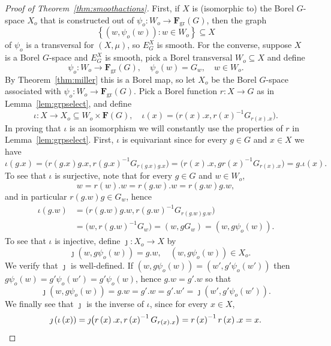 \documentclass{amsart}
\numberwithin{equation}{subsection}
\begin{document}
\begin{proof}[Proof of Theorem~\ref{thm:smoothactions}]
First, if \(X\) is (isomorphic to) the Borel \(G\)-space \(X_{o}\) that is constructed out of \(\psi_{o}:W_{o}\to\mathbf{F}_{\mathrm{gr}}\left(G\right)\), then the graph
\[\left\{ \left(w,\psi_{o}\left(w\right)\right):w\in W_{o}\right\} \subseteq X\]
of \(\psi_{o}\) is a transversal for \(\left(X,\mu\right)\), so \(E_{G}^{X}\) is  smooth. For the converse, suppose \(X\) is a Borel \(G\)-space and \(E_{G}^{X}\) is smooth, pick a Borel transversal \(W_{o}\subseteq X\) and define
\[\psi_{o}:W_{o}\to\mathbf{F}_{\mathrm{gr}}\left(G\right),\quad\psi_{o}\left(w\right)=G_{w},\quad w\in W_{o}.\]
By Theorem~\ref{thm:miller} this is a Borel map, so let \(X_{o}\) be the Borel \(G\)-space associated with \(\psi_{o}:W_{o}\to\mathbf{F}_{\mathrm{gr}}\left(G\right)\). Pick a Borel function \(r:X\to G\) as in Lemma~\ref{lem:grpselect}, and define
\[\iota:X\to X_{o}\subseteq W_{o}\times\mathbf{F}\left(G\right),\quad\iota\left(x\right)=\big(r\left(x\right).x,r\left(x\right)^{-1}G_{r\left(x\right).x}\big).\]
In proving that \(\iota\) is an isomorphism we will constantly use the properties of \(r\) in Lemma~\ref{lem:grpselect}. First, \(\iota\) is equivariant since for every \(g\in G\) and \(x\in X\) we have
\[\iota\left(g.x\right)=\big(r\left(g.x\right)g.x,r\left(g.x\right)^{-1}G_{r\left(g.x\right)g.x}\big)=\big(r\left(x\right).x,gr\left(x\right)^{-1}G_{r\left(x\right).x}\big)=g.\iota\left(x\right).\]To see that \(\iota\) is surjective, note that for every \(g\in G\) and \(w\in W_{o}\),    \[w=r\left(w\right).w=r\left(g.w\right).w=r\left(g.w\right)g.w,\]
and in particular \(r\left(g.w\right)g\in G_{w}\), hence
\begin{align*}
\iota\left(g.w\right)
&=\big(r\left(g.w\right)g.w,r\left(g.w\right)^{-1}G_{r\left(g.w\right)g.w}\big)\\
&=\big(w,r\left(g.w\right)^{-1}G_{w}\big)=\left(w,gG_{w}\right)=\left(w,g\psi_{o}\left(w\right)\right).
\end{align*}
To see that \(\iota\) is injective, define \(\jmath:X_{o}\to X\) by
\[\quad\jmath\left(w,g\psi_{o}\left(w\right)\right)=g.w,\quad\left(w,g\psi_{o}\left(w\right)\right)\in X_{o}.\]
We verify that \(\jmath\) is well-defined. If \(\left(w,g\psi_{o}\left(w\right)\right)=\left(w',g'\psi_{o}\left(w'\right)\right)\) then \(g\psi_{o}\left(w\right)=g'\psi_{o}\left(w'\right)=g'\psi_{o}\left(w\right)\), hence \(g.w=g'.w\) so that
\[\jmath\left(w,g\psi_{o}\left(w\right)\right)=g.w=g'.w=g'.w'=\jmath\left(w',g'\psi_{o}\left(w'\right)\right).\]
We finally see that \(\jmath\) is the inverse of \(\iota\), since for every \(x\in X\),
\[\jmath\left(\iota\left(x\right)\right)=\jmath\big(r\left(x\right).x,r\left(x\right)^{-1}G_{r\left(x\right).x}\big)=r\left(x\right)^{-1}r\left(x\right).x=x.\qedhere\]
\end{proof}
\end{document}
